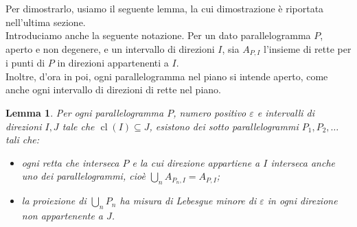 \documentclass[a4paper, twoside,openright]{article}
\newcommand{\<}{\langle}
\renewcommand{\>}{\rangle}
\newtheorem{lemma}[teo]{Lemma}
\begin{document}
Per dimostrarlo, usiamo il seguente lemma, la cui dimostrazione è riportata nell'ultima sezione.\\
Introduciamo anche la seguente notazione. Per un dato parallelogramma $P$, aperto e non degenere, e un intervallo di direzioni $I$, sia $A_{P, I}$ l'insieme di rette per i punti di $P$ in direzioni appartenenti a $I$.\\
Inoltre, d'ora in poi, ogni parallelogramma nel piano si intende aperto, come anche ogni intervallo di direzioni di rette nel piano.

\begin{lemma} \label{lemmabrutto}
Per ogni parallelogramma $P$, numero positivo $\varepsilon$ e intervalli di direzioni $I, J$ tale che $\operatorname{cl}(I) \subseteq J$, esistono dei sotto parallelogrammi $P_{1}, P_{2}, \ldots$ tali che:
\begin{itemize}
	\item ogni retta che interseca $P$ e la cui direzione appartiene a $I$ interseca anche uno dei parallelogrammi, cioè $\bigcup_{n} A_{P_{n}, I}=A_{P, I}$;
	\item la proiezione di $\bigcup_{n} P_{n}$ ha misura di Lebesgue minore di $\varepsilon$ in ogni direzione non appartenente a $J$.
\end{itemize}
\end{lemma}
\end{document}
